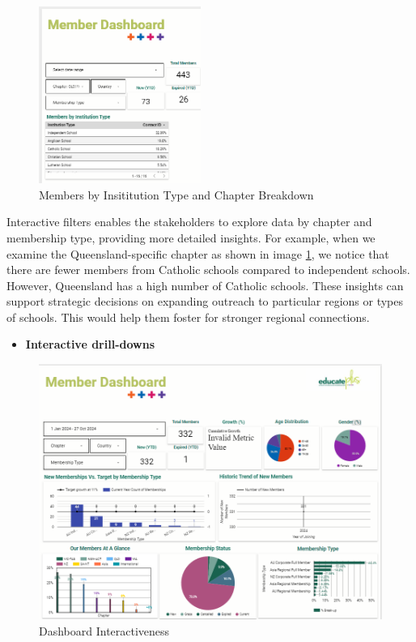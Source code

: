 \documentclass[11pt,a4paper,]{article}
\providecommand{\tightlist}{%
  \setlength{\itemsep}{0pt}\setlength{\parskip}{0pt}}
\begin{document}
\begin{figure}[H]

{\centering \includegraphics[width=200px]{Images/chapter_school_type_breakdown} 

}

\caption{ Members by Insititution Type and Chapter Breakdown}\label{fig:insight-3}
\end{figure}

Interactive filters enables the stakeholders to explore data by chapter and membership type, providing more detailed insights.
For example, when we examine the Queensland-specific chapter as shown in image \ref{fig:insight-3}, we notice that there are fewer members from Catholic schools compared to independent schools. However, Queensland has a high number of Catholic schools. These insights can support strategic decisions on expanding outreach to particular regions or types of schools. This would help them foster for stronger regional connections.

\begin{itemize}
\tightlist
\item
  \textbf{Interactive drill-downs}
\end{itemize}

\begin{figure}[H]

{\centering \includegraphics[width=0.8\linewidth]{Images/member_interactiveness} 

}

\caption{Dashboard Interactiveness}\label{fig:insight-4}
\end{figure}
\end{document}
